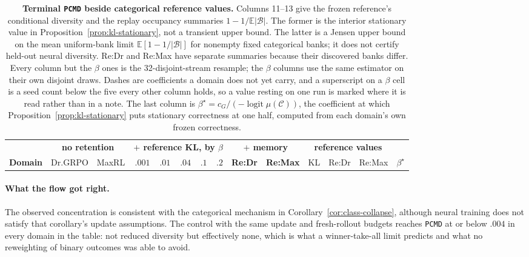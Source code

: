 \documentclass{article}
\newcommand{\1}{\mathbf 1}
\newcommand{\E}{\mathbb E}
\newcommand{\pmd}{\texttt{PCMD}}
\theoremstyle{remark}
\theoremstyle{definition}
\theoremstyle{plain}
\begin{document}
\begin{table}[t]
  \centering
  \caption{\textbf{Terminal \pmd{} beside categorical reference values.}
  Columns 11--13 give the frozen reference's conditional diversity and
  the replay occupancy summaries $1-1/\E|\mathcal B|$.
  The former is the interior stationary value in
  Proposition~\ref{prop:kl-stationary}, not a transient upper bound.
  The latter is a Jensen upper bound on the mean uniform-bank limit
  $\E[1-1/|\mathcal B|]$ for nonempty fixed categorical banks; it does not
  certify held-out neural diversity. Re:Dr and Re:Max have separate summaries
  because their discovered banks differ. Every
  column but the $\beta$ ones is the 32-disjoint-stream resample; the $\beta$
  columns use the same estimator on their own disjoint draws. Dashes are
  coefficients a domain does not yet carry, and a superscript on a $\beta$ cell
  is a seed count below the five every other column holds, so a value resting
  on one run is marked where it is read rather than in a note. The last column
  is $\beta^\star=c_G/(-\operatorname{logit}\mu(\mathcal C))$, the coefficient
  at which Proposition~\ref{prop:kl-stationary} puts stationary correctness at
  one half, computed from each domain's own frozen correctness.}
  \label{tab:reference-kl-measured}
  \scriptsize
  \setlength{\tabcolsep}{2.9pt}
  \begin{tabular}{@{}lrrrrrrrrrrrrr@{}}
    \toprule
    & \multicolumn{2}{c}{\textbf{no retention}}
      & \multicolumn{5}{c}{\textbf{$+$ reference KL, by $\beta$}}
      & \multicolumn{2}{c}{\textbf{$+$ memory}}
      & \multicolumn{3}{c}{\textbf{reference values}} & \\
    \cmidrule(lr){2-3}\cmidrule(lr){4-8}\cmidrule(lr){9-10}\cmidrule(lr){11-13}
    \textbf{Domain} & Dr.GRPO & MaxRL
      & $.001$ & $.01$ & $.04$ & $.1$ & $.2$
      & \textbf{Re:Dr} & \textbf{Re:Max}
      & KL & Re:Dr & Re:Max & $\beta^\star$ \\
    \midrule
    
  \end{tabular}
\end{table}
\paragraph{What the flow got right.}
The observed concentration is consistent with the categorical mechanism
in Corollary~\ref{cor:class-collapse}, although neural training does not
satisfy that corollary's update assumptions. The
control with the same update and fresh-rollout budgets reaches \pmd{} at or below $.004$ in every domain in
the table: not reduced diversity but effectively none, which is what a
winner-take-all limit predicts and what no reweighting of binary outcomes was
able to avoid.
\end{document}
